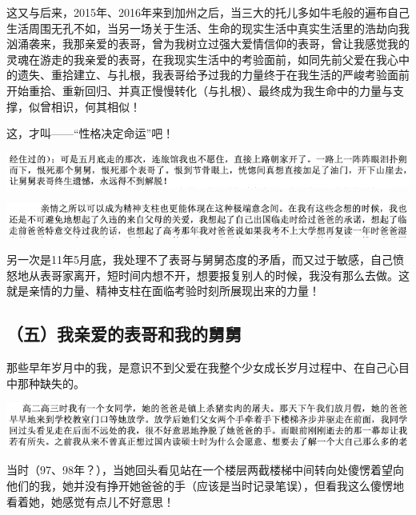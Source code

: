 \documentclass[9pt, b5paper]{article}
\begin{document}
这又与后来，2015年、2016年来到加州之后，当三大的托儿多如牛毛般的遍布自己生活周围无孔不如，当另一场关于生活、生命的现实生活中真实生活里的浩劫向我汹涌袭来，我那亲爱的表哥，曾为我树立过强大爱情信仰的表哥，曾让我感觉我的灵魂在游走的我亲爱的表哥，在我现实生活中的考验面前，如同先前父爱在我心中的遗失、重拾建立、与扎根，我表哥给予过我的力量终于在我生活的严峻考验面前开始重拾、重新回归、并真正慢慢转化（与扎根）、最终成为我生命中的力量与支撑，似曾相识，何其相似！

这，才叫——“性格决定命运”吧！

\begin{center}
\includegraphics[width=.9\linewidth]{./pic/backups_plans_20210422_180127.png}
\end{center}

\begin{center}
\includegraphics[width=.9\linewidth]{./pic/backups_plans_20210422_223454.png}
\end{center}

另一次是11年5月底，我处理不了表哥与舅舅态度的矛盾，而又过于敏感，自己愤怒地从表哥家离开，短时间内想不开，想要报复别人的时候，我没有那么去做。这就是亲情的力量、精神支柱在面临考验时刻所展现出来的力量！

\subsection{（五）我亲爱的表哥和我的舅舅}
\label{sec:org2667cf4}

那些早年岁月中的我，是意识不到父爱在我整个少女成长岁月过程中、在自己心目中那种缺失的。

\begin{center}
\includegraphics[width=.9\linewidth]{./pic/backups_plans_20210423_104856.png}
\end{center}

当时（97、98年？），当她回头看见站在一个楼层两截楼梯中间转向处傻愣着望向他们的我，她并没有挣开她爸爸的手（应该是当时记录笔误），但看我这么傻愣地看着她，她感觉有点儿不好意思！
\end{document}
